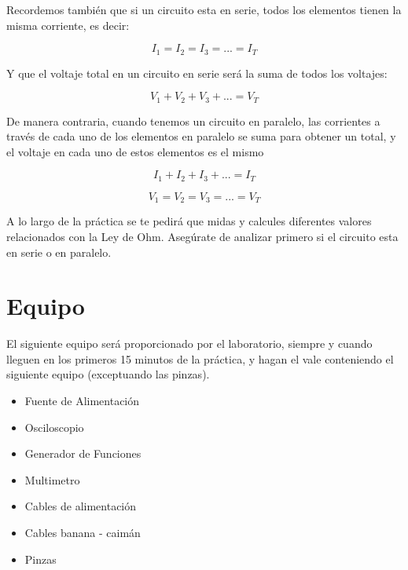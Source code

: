 \documentclass[paper=letter, fontsize=11pt]{scrartcl} %
\numberwithin{equation}{section} %
\numberwithin{figure}{section} %
\numberwithin{table}{section} %
\begin{document}
		Recordemos también que si un circuito esta en serie, todos los elementos tienen la misma corriente, es decir:

		\begin{equation}
			I_1 = I_2 = I_3 = ... = I_T
		\end{equation}

		Y que el voltaje total en un circuito en serie será la suma de todos los voltajes:

		\begin{equation}
			V_1 + V_2 + V_3 + ... = V_T
		\end{equation}

		De manera contraria, cuando tenemos un circuito en paralelo, las corrientes a través de cada uno de los elementos en paralelo se suma para obtener un total, y el voltaje en cada uno de estos elementos es el mismo

		\begin{equation}
			I_1 + I_2 + I_3 + ... = I_T
		\end{equation}

		\begin{equation}
			V_1 = V_2 = V_3 = ... = V_T
		\end{equation}

		A lo largo de la práctica se te pedirá que midas y calcules diferentes valores relacionados con la Ley de Ohm. Asegúrate de analizar primero si el circuito esta en serie o en paralelo.


\section{Equipo}

	El siguiente equipo será proporcionado por el laboratorio, siempre y cuando lleguen en los primeros 15 minutos de la práctica, y hagan el vale conteniendo el siguiente equipo (exceptuando las pinzas).

	\begin{itemize}
		\item Fuente de Alimentación
		\item Osciloscopio
		\item Generador de Funciones
		\item Multimetro
		\item Cables de alimentación
		\item Cables banana - caimán
		\item Pinzas
	\end{itemize}
\end{document}
